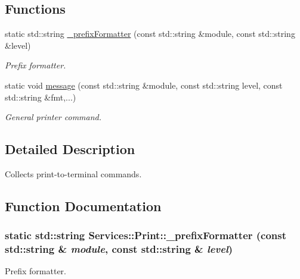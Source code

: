 \subsection*{Functions}
\begin{CompactItemize}
\item 
static std::string \hyperlink{namespaceServices_1_1Print_951fe5b070948dba021542314f2b7581}{\_\-prefix\-Formatter} (const std::string \&module, const std::string \&level)
\begin{CompactList}\small\item\em Prefix formatter. \item\end{CompactList}\item 
static void \hyperlink{namespaceServices_1_1Print_2bfc723913ff7be28a3d64a11a973fd3}{message} (const std::string \&module, const std::string level, const std::string \&fmt,...)
\begin{CompactList}\small\item\em General printer command. \item\end{CompactList}\end{CompactItemize}


\subsection{Detailed Description}
Collects print-to-terminal commands. 

\subsection{Function Documentation}
\hypertarget{namespaceServices_1_1Print_951fe5b070948dba021542314f2b7581}{
\subsubsection[\_\-prefixFormatter]{\setlength{\rightskip}{0pt plus 5cm}static std::string Services::Print::\_\-prefix\-Formatter (const std::string \& {\em module}, const std::string \& {\em level})}}
\label{namespaceServices_1_1Print_951fe5b070948dba021542314f2b7581}


Prefix formatter. 


